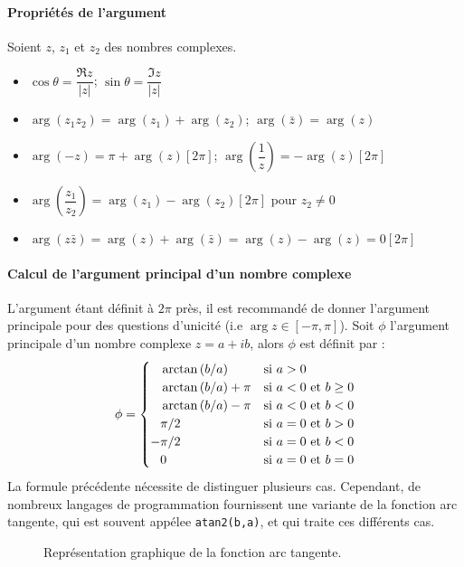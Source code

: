 \paragraph{Propriétés de l'argument}
Soient $z$, $z_1$ et $z_2$ des nombres complexes.
\begin{itemize}
    \item $\cos\theta=\dfrac{\Re{z}}{|z|}$; $\sin\theta=\dfrac{\Im{z}}{|z|}$
    \item $\arg(z_1z_2)=\arg(z_1)+\arg(z_2)$; $\arg(\bar{z})=\arg(z)$
    \item $\arg(-z)=\pi+\arg(z)[2\pi]$; 
          $\arg\left(\dfrac{1}{z}\right)=-\arg(z)[2\pi]$
    \item $\arg\left(\dfrac{z_1}{z_2}\right)=\arg(z_1)-\arg(z_2)[2\pi]$ 
          pour $z_2\neq0$
    \item $\arg(z\bar{z})=\arg(z)+\arg(\bar{z})=\arg(z)-\arg(z)=0[2\pi]$
\end{itemize}
\paragraph{Calcul de l'argument principal d'un nombre complexe}
L'argument étant définit à $2\pi$ près, il est recommandé de donner 
l'argument principale pour des questions d'unicité 
(i.e $\arg{z}\in[-\pi,\pi]$). 
Soit $\phi$ l'argument principale d'un nombre complexe $z=a+ib$, alors 
$\phi$ est définit par :
$$
\phi=
\begin{cases}
    \hphantom{-}\arctan{(b/a)}     & \text{si $a>0$} \\
    \hphantom{-}\arctan{(b/a)}+\pi & \text{si $a<0$ et $b\ge0$} \\
    \hphantom{-}\arctan{(b/a)}-\pi & \text{si $a<0$ et $b<0$} \\
    \hphantom{-} \pi/2             & \text{si $a=0$ et $b>0$} \\
                -\pi/2             & \text{si $a=0$ et $b<0$} \\
    \hphantom{-}0                  & \text{si $a=0$ et $b=0$} \\
\end{cases}
$$
La formule précédente nécessite de distinguer plusieurs cas.
Cependant, de nombreux langages de programmation fournissent
une variante de la fonction arc tangente, qui est souvent appélee
\verb?atan2(b,a)?, et qui traite ces différents cas. 
\begin{figure}[!ht]
    \centering
    
    \caption{Représentation graphique de la fonction arc tangente.
             \label{fig-arctangente}}
\end{figure}
